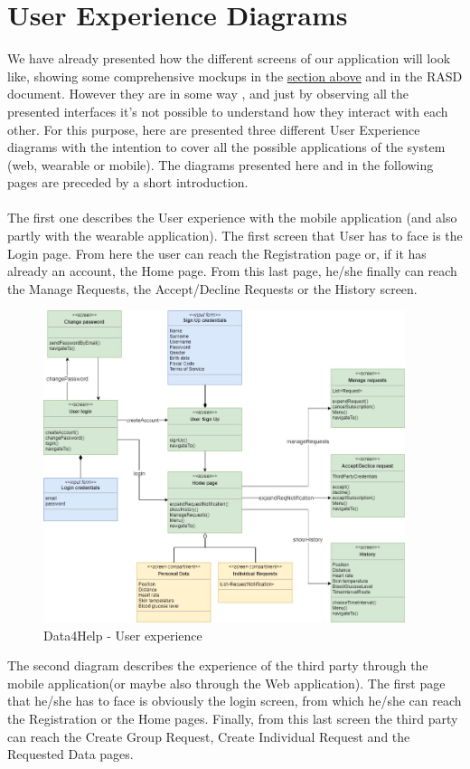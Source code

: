 \section{User Experience Diagrams}
We have already presented how the different screens of our application will look like, showing some comprehensive mockups in the \hyperlink{MK}{\underline{section above}} and in the RASD document. However they are in some way , and just by observing all the presented interfaces it's not possible to understand how they interact with each other.
For this purpose, here are presented three different User Experience diagrams with the intention to cover all the possible applications of the system (web, wearable or mobile).
The diagrams presented here and in the following pages are preceded by a short introduction.\\ \\
The first one describes the User experience with the mobile application (and also partly with the wearable application). The first screen that User has to face is the Login page. From here the user can reach the Registration page or, if it has already an account, the Home page. From this last page, he/she finally can reach the Manage Requests, the Accept/Decline Requests or the History screen.
\begin{figure}[ht]
    \centering
    \includegraphics[width=300pt]{images/UX/UX_Diagram1.jpg}
    \caption{Data4Help - User experience}
    \label{UX1}
\end{figure}
\clearpage
\noindent The second diagram describes the experience of the third party through the mobile application(or maybe also through the Web application). The first page that he/she has to face is obviously the login screen, from which he/she can reach the Registration or the Home pages. Finally, from this last screen the third party can reach the Create Group Request, Create Individual Request and the Requested Data pages.
